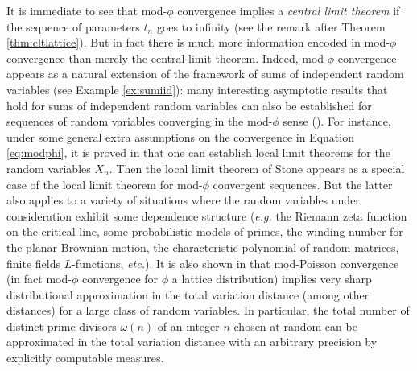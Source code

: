 \documentclass[12pt,a4paper,reqno]{amsart}
\theoremstyle{remark}
\begin{document}
It is immediate to see that mod-$\phi$ convergence implies a \emph{central limit theorem} if the sequence of parameters $t_{n}$ goes to infinity (see the remark after Theorem \ref{thm:cltlattice}). But in fact there is much more information encoded in mod-$\phi$ convergence than merely the central limit theorem. Indeed, mod-$\phi$ convergence appears as a natural extension of the framework of sums of independent random variables (see Example \ref{ex:sumiid}): many interesting asymptotic results  that hold for sums of independent random variables can also be established for sequences of random variables converging in the mod-$\phi$ sense (\cite{JKN11,DKN11,KN10, KN12, BKN09}). For instance, under some general extra assumptions on the convergence in Equation \eqref{eq:modphi}, it is proved in \cite{DKN11,KN12,FMN14} that one can establish local limit theorems for the random variables $X_n$. Then the local limit theorem of Stone appears as a special case of the local limit theorem for mod-$\phi$ convergent sequences.
But the latter also applies to a variety of situations where the random variables under consideration exhibit some dependence structure (\emph{e.g.} the Riemann zeta function on the critical line,  some probabilistic models of primes, the winding number for the planar Brownian motion, the characteristic polynomial of random  matrices, finite fields $L$-functions, \emph{etc.}). It is also shown in \cite{BKN09} that mod-Poisson convergence (in fact mod-$\phi$ convergence for $\phi$ a lattice distribution) implies very sharp distributional approximation in the total variation distance (among other distances) for a large class of random variables. 
In particular, the total number of distinct prime divisors $\omega(n)$ of an integer $n$ chosen at random can be approximated in the total variation distance with an arbitrary precision by explicitly computable measures. \bigskip
\end{document}
